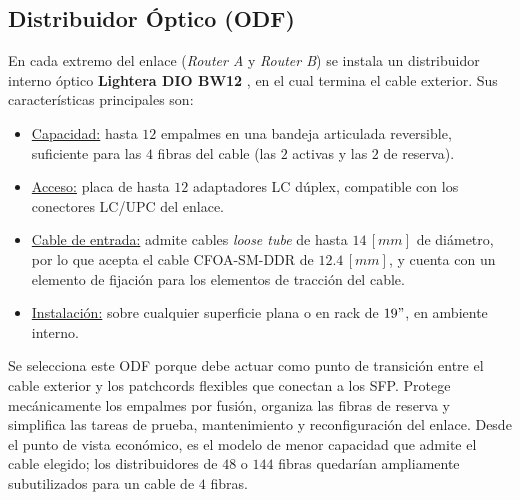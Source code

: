 \subsection{Distribuidor Óptico (ODF)}
\label{sec_2.4}
En cada extremo del enlace (\textit{Router A} y \textit{Router B}) se instala un distribuidor interno óptico \textbf{Lightera DIO BW12} \cite{b4}, en el cual termina el cable exterior. Sus características principales son:
\begin{itemize}
    \item \underline{Capacidad:} hasta $12$ empalmes en una bandeja articulada reversible, suficiente para las $4$ fibras del cable (las $2$ activas y las $2$ de reserva).
    \item \underline{Acceso:} placa de hasta $12$ adaptadores LC dúplex, compatible con los conectores LC/UPC del enlace.
    \item \underline{Cable de entrada:} admite cables \textit{loose tube} de hasta $14 \, [mm]$ de diámetro, por lo que acepta el cable CFOA-SM-DDR de $12.4 \, [mm]$, y cuenta con un elemento de fijación para los elementos de tracción del cable.
    \item \underline{Instalación:} sobre cualquier superficie plana o en rack de $19"$, en ambiente interno.
\end{itemize}

Se selecciona este ODF porque debe actuar como punto de transición entre el cable exterior y los patchcords flexibles que conectan a los SFP. Protege mecánicamente los empalmes por fusión, organiza las fibras de reserva y simplifica las tareas de prueba, mantenimiento y reconfiguración del enlace. Desde el punto de vista económico, es el modelo de menor capacidad que admite el cable elegido; los distribuidores de $48$ o $144$ fibras quedarían ampliamente subutilizados para un cable de $4$ fibras.
